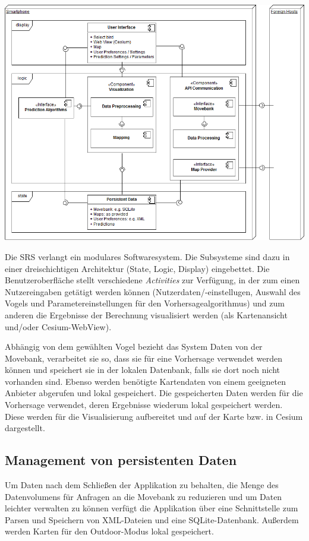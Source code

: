 \documentclass[12pt]{article} %
\begin{document}
\includegraphics[width = \textwidth]{Diagramme/ComponentDiagram.png}

\vspace{1em}

Die SRS verlangt ein modulares Softwaresystem. Die Subsysteme sind dazu in einer dreischichtigen Architektur (State, Logic, Display) eingebettet. Die Benutzeroberfläche stellt verschiedene \textit{Activities} zur Verfügung, in der zum einen Nutzereingaben getätigt werden können (Nutzerdaten/-einstellugen, Auswahl des Vogels und Parametereinstellungen für den Vorhersagealgorithmus) und zum anderen die Ergebnisse der Berechnung visualisiert werden (als Kartenansicht und/oder Cesium-WebView).

Abhängig von dem gewählten Vogel bezieht das System Daten von der Movebank, verarbeitet sie so, dass sie für eine Vorhersage verwendet werden können und speichert sie in der lokalen Datenbank, falls sie dort noch nicht vorhanden sind. Ebenso werden benötigte Kartendaten von einem geeigneten Anbieter abgerufen und lokal gespeichert. Die gespeicherten Daten werden für die Vorhersage verwendet, deren Ergebnisse wiederum lokal gespeichert werden. Diese werden für die Visualisierung aufbereitet und auf der Karte bzw. in Cesium dargestellt.

\subsection{Management von persistenten Daten}

Um Daten nach dem Schließen der Applikation zu behalten, die Menge des Datenvolumens für Anfragen an die Movebank zu reduzieren und um Daten leichter verwalten zu können verfügt die Applikation über eine Schnittstelle zum Parsen und Speichern von XML-Dateien und eine SQLite-Datenbank. Außerdem werden Karten für den Outdoor-Modus lokal gespeichert.
\end{document}
